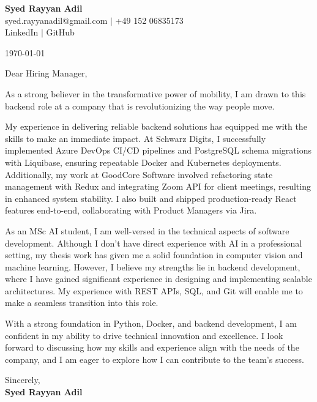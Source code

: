 \documentclass[11pt]{article}
\begin{document}
\begin{center}
    {\Huge \textbf{Syed Rayyan Adil}} \\ \vspace{5pt}
    syed.rayyanadil@gmail.com $|$ +49 152 06835173 \\
    LinkedIn $|$ GitHub
\end{center}

\vspace{20pt}

\today

\vspace{10pt}

Dear Hiring Manager,

\vspace{10pt}

As a strong believer in the transformative power of mobility, I am drawn to this backend role at a company that is revolutionizing the way people move.

My experience in delivering reliable backend solutions has equipped me with the skills to make an immediate impact. At Schwarz Digits, I successfully implemented Azure DevOps CI/CD pipelines and PostgreSQL schema migrations with Liquibase, ensuring repeatable Docker and Kubernetes deployments. Additionally, my work at GoodCore Software involved refactoring state management with Redux and integrating Zoom API for client meetings, resulting in enhanced system stability. I also built and shipped production-ready React features end-to-end, collaborating with Product Managers via Jira.

As an MSc AI student, I am well-versed in the technical aspects of software development. Although I don't have direct experience with AI in a professional setting, my thesis work has given me a solid foundation in computer vision and machine learning. However, I believe my strengths lie in backend development, where I have gained significant experience in designing and implementing scalable architectures. My experience with REST APIs, SQL, and Git will enable me to make a seamless transition into this role.

With a strong foundation in Python, Docker, and backend development, I am confident in my ability to drive technical innovation and excellence. I look forward to discussing how my skills and experience align with the needs of the company, and I am eager to explore how I can contribute to the team's success.



\vspace{20pt}

Sincerely, \\
\vspace{10pt}
\textbf{Syed Rayyan Adil}
\end{document}
